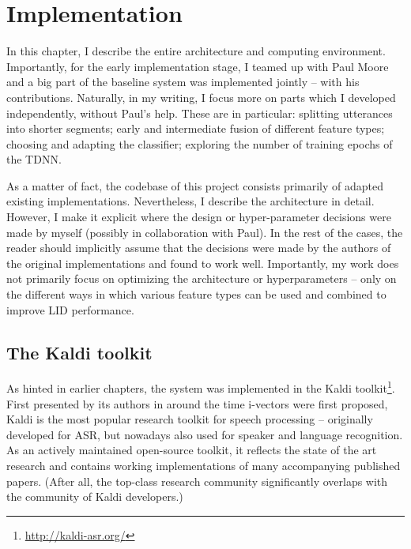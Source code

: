 \documentclass[bsc,frontabs,twoside,singlespacing,parskip,deptreport]{infthesis}
\begin{document}
\chapter{Implementation}{
  \label{chap:Implementation}
  

  In this chapter, I describe the entire architecture and computing environment.
  Importantly, for the early implementation stage, I teamed up with Paul Moore and a big part of the baseline system was implemented jointly -- with his contributions. Naturally, in my writing, I focus more on parts which I developed independently, without Paul's help. These are in particular: splitting utterances into shorter segments; early and intermediate fusion of different feature types; choosing and adapting the classifier; exploring the number of training epochs of the TDNN.
  
  As a matter of fact, the codebase of this project consists primarily of adapted existing implementations. Nevertheless, I describe the architecture in detail. However, I make it explicit where the design or hyper-parameter decisions were made by myself (possibly in collaboration with Paul). In the rest of the cases, the reader should implicitly assume that the decisions were made by the authors of the original implementations and found to work well. Importantly, my work does not primarily focus on optimizing the architecture or hyperparameters -- only on the different ways in which various feature types can be used and combined to improve LID performance.

  \section{The Kaldi toolkit}{
    \label{sec:kaldi}

    As hinted in earlier chapters, the system was implemented in the Kaldi toolkit\footnote{\url{http://kaldi-asr.org/}}.
    First presented by its authors in \citep{Povey_et_al_2011} around the time i-vectors were first proposed, Kaldi is the most popular research toolkit for speech processing -- originally developed for ASR, but nowadays also used for speaker and language recognition.
    As an actively maintained open-source toolkit, it reflects the state of the art research and contains working implementations of many accompanying published papers. (After all, the top-class research community significantly overlaps with the community of Kaldi developers.)
    
}}
\end{document}
